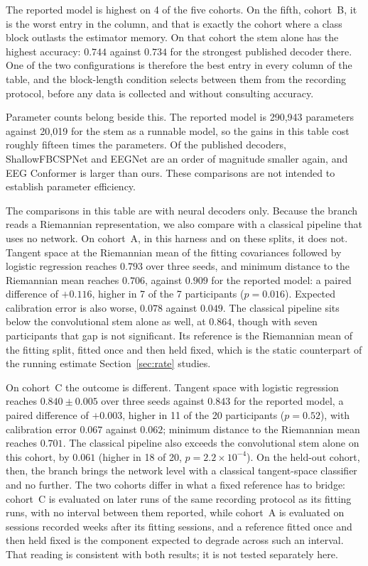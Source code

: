 \documentclass[a4paper,fleqn]{cas-dc}
\begin{document}
The reported model is highest on 4 of the five cohorts. On the fifth, cohort~B, it is the worst entry in the column, and that is exactly the cohort where a class block outlasts the estimator memory. On that cohort the stem alone has the highest accuracy: $0.744$ against $0.734$ for the strongest published decoder there. One of the two configurations is therefore the best entry in every column of the table, and the block-length condition selects between them from the recording protocol, before any data is collected and without consulting accuracy.

Parameter counts belong beside this. The reported model is 290{,}943 parameters against 20{,}019 for the stem as a runnable model, so the gains in this table cost roughly fifteen times the parameters. Of the published decoders, ShallowFBCSPNet and EEGNet are an order of magnitude smaller again, and EEG Conformer is larger than ours. These comparisons are not intended to establish parameter efficiency.

The comparisons in this table are with neural decoders only. Because the branch reads a Riemannian representation, we also compare with a classical pipeline that uses no network. On cohort~A, in this harness and on these splits, it does not. Tangent space at the Riemannian mean of the fitting covariances followed by logistic regression reaches $0.793$ over three seeds, and minimum distance to the Riemannian mean reaches $0.706$, against $0.909$ for the reported model: a paired difference of $+0.116$, higher in 7 of the 7 participants ($p=0.016$). Expected calibration error is also worse, $0.078$ against $0.049$. The classical pipeline sits below the convolutional stem alone as well, at $0.864$, though with seven participants that gap is not significant. Its reference is the Riemannian mean of the fitting split, fitted once and then held fixed, which is the static counterpart of the running estimate Section~\ref{sec:rate} studies.

On cohort~C the outcome is different. Tangent space with logistic regression reaches $0.840 \pm 0.005$ over three seeds against $0.843$ for the reported model, a paired difference of $+0.003$, higher in 11 of the 20 participants ($p=0.52$), with calibration error $0.067$ against $0.062$; minimum distance to the Riemannian mean reaches $0.701$. The classical pipeline also exceeds the convolutional stem alone on this cohort, by $0.061$ (higher in 18 of 20, $p=2.2\times10^{-4}$). On the held-out cohort, then, the branch brings the network level with a classical tangent-space classifier and no further. The two cohorts differ in what a fixed reference has to bridge: cohort~C is evaluated on later runs of the same recording protocol as its fitting runs, with no interval between them reported, while cohort~A is evaluated on sessions recorded weeks after its fitting sessions, and a reference fitted once and then held fixed is the component expected to degrade across such an interval. That reading is consistent with both results; it is not tested separately here.
\end{document}
